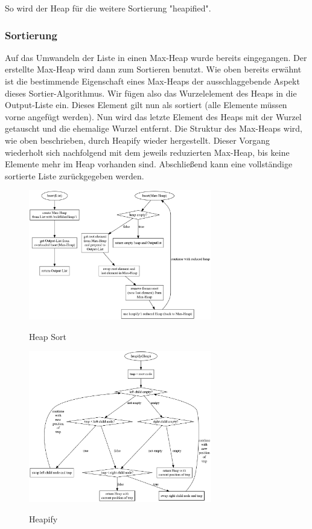 \documentclass[11pt]{article}
\begin{document}
    So wird der Heap für die weitere Sortierung "heapified".

    \subsubsection{Sortierung}
    Auf das Umwandeln der Liste in einen Max-Heap wurde bereits eingegangen.
    Der erstellte Max-Heap wird dann zum Sortieren benutzt.
    Wie oben bereits erwähnt ist die bestimmende Eigenschaft eines Max-Heaps
    der ausschlaggebende Aspekt dieses Sortier-Algorithmus.
    Wir fügen also das Wurzelelement des Heaps in die Output-Liste ein.
    Dieses Element gilt nun als sortiert (alle Elemente müssen vorne angefügt
    werden).
    Nun wird das letzte Element des Heaps mit der Wurzel getauscht und die
    ehemalige Wurzel entfernt.
    Die Struktur des Max-Heaps wird, wie oben beschrieben, durch Heapify
    wieder hergestellt.
    Dieser Vorgang wiederholt sich nachfolgend mit dem jeweils reduzierten
    Max-Heap, bis keine Elemente mehr im Heap vorhanden sind.
    Abschließend kann eine vollständige sortierte Liste zurückgegeben werden.




    \begin{figure}[hbt]
        \caption{Heap Sort}
        \centering
        \includegraphics[width = 8cm]{hsort.pdf}\label{fig:hsort}
    \end{figure}

    \begin{figure}[hbt]
        \caption{Heapify}
        \centering
        \includegraphics[width = 8cm]{heapify.pdf}\label{fig:heapify}
    \end{figure}
\end{document}
